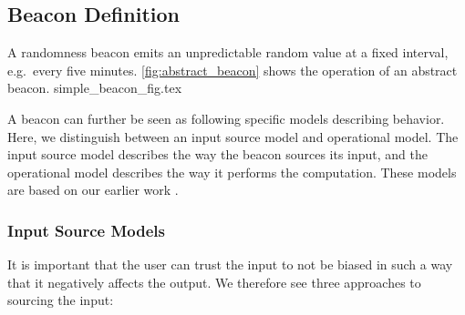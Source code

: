 




\subsection{Beacon Definition}

A randomness beacon emits an unpredictable random value at a fixed interval, e.g.\ every five minutes. \cref{fig:abstract_beacon} shows the operation of an abstract beacon.
{simple_beacon_fig.tex}

A beacon can further be seen as following specific models describing behavior. Here, we distinguish between an input source model and operational model. The input source model describes the way the beacon sources its input, and the operational model describes the way it performs the computation. These models are based on our earlier work .

\subsubsection{Input Source Models}
It is important that the user can trust the input to not be biased in such a way that it negatively affects the output. We therefore see three approaches to sourcing the input:


